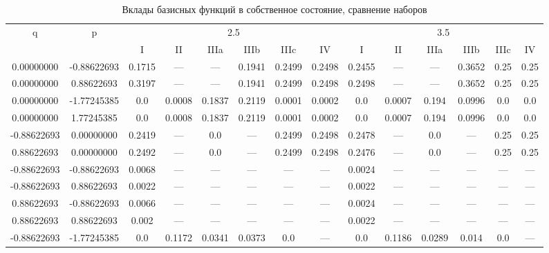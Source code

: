 \documentclass[a4paper,14pt]{extarticle}
\begin{document}
\begin{landscape}
\begin{table}[H]
\centering
\caption{Вклады базисных функций в собственное состояние, сравнение наборов}
\begin{tabular}{|c|c|*{6}{c}|*{6}{c}|}
\hline
\multirow{2}{*}{q} & \multirow{2}{*}{p} & \multicolumn{6}{|c|}{2.5}                           & \multicolumn{6}{|c|}{3.5}                        \\
\cline{3-14}
                   &                    & I      & II     & IIIa   & IIIb   & IIIc   & IV     & I      & II     & IIIa   & IIIb   & IIIc & IV    \\ 
\hline
 0.00000000        & -0.88622693        & 0.1715 & ---    & ---    & 0.1941 & 0.2499 & 0.2498 & 0.2455 & ---    & ---    & 0.3652 & 0.25 & 0.25  \\ 
 0.00000000        &  0.88622693        & 0.3197 & ---    & ---    & 0.1941 & 0.2499 & 0.2498 & 0.2498 & ---    & ---    & 0.3652 & 0.25 & 0.25  \\
 0.00000000        & -1.77245385        & 0.0    & 0.0008 & 0.1837 & 0.2119 & 0.0001 & 0.0002 & 0.0    & 0.0007 & 0.194  & 0.0996 & 0.0  & 0.0   \\
 0.00000000        &  1.77245385        & 0.0    & 0.0008 & 0.1837 & 0.2119 & 0.0001 & 0.0002 & 0.0    & 0.0007 & 0.194  & 0.0996 & 0.0  & 0.0   \\
-0.88622693        &  0.00000000        & 0.2419 & ---    & 0.0    & ---    & 0.2499 & 0.2498 & 0.2478 & ---    & 0.0    & ---    & 0.25 & 0.25  \\
 0.88622693        &  0.00000000        & 0.2492 & ---    & 0.0    & ---    & 0.2499 & 0.2498 & 0.2476 & ---    & 0.0    & ---    & 0.25 & 0.25  \\
-0.88622693        & -0.88622693        & 0.0068 & ---    & ---    & ---    & ---    & ---    & 0.0024 & ---    & ---    & ---    & ---  & ---   \\
-0.88622693        &  0.88622693        & 0.0022 & ---    & ---    & ---    & ---    & ---    & 0.0022 & ---    & ---    & ---    & ---  & ---   \\
 0.88622693        & -0.88622693        & 0.0066 & ---    & ---    & ---    & ---    & ---    & 0.0024 & ---    & ---    & ---    & ---  & ---   \\
 0.88622693        &  0.88622693        & 0.002  & ---    & ---    & ---    & ---    & ---    & 0.0022 & ---    & ---    & ---    & ---  & ---   \\
-0.88622693        & -1.77245385        & 0.0    & 0.1172 & 0.0341 & 0.0373 & 0.0    & ---    & 0.0    & 0.1186 & 0.0289 & 0.014  & 0.0  & ---   \\

\end{tabular}
\end{table}
\end{landscape}
\end{document}
